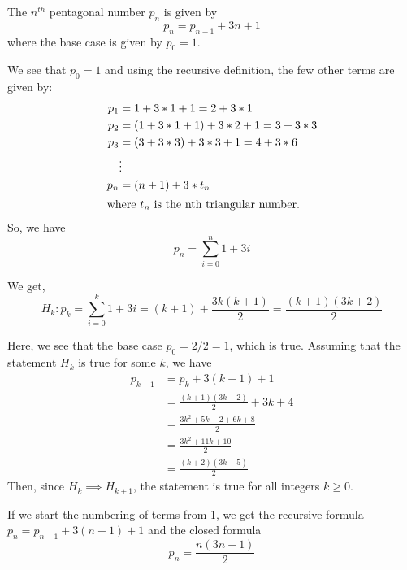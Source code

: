 \begin{questions}
    \begin{solution}
        The $n^{th}$ pentagonal number $p_n$ is given by $$p_{n}
        =p_{n-1} + 3n +1$$
        where the base case is given by $p_0=1$.
    \end{solution}

    \begin{solution}
        We see that $p_0 = 1$ and using the recursive definition, 
        the few other terms are given by:
        \begin{align*}
            p_1 &= 1 +3*1+1=2+3*1\\
            p_2 &= \left(1+3*1+1\right) +3*2+1
            =3+3*3\\
            p_3 &= \left(3+3*3\right)+3*3+1
            =4+3*6\\
            &\vdots\\
            p_n &= (n+1)+3*t_n\\
            \shortintertext{where $t_n$ is the nth triangular number.}
        \end{align*}
        So, we have
        $$p_n = \sum_{i=0}^n{1+3i}$$
    \end{solution}

    \begin{solution}
        We get, 
        \begin{equation}
            H_k: p_k = \sum_{i=0}^k{1+3i} = (k+1)+\frac{3k(k+1)}{2}
        =\frac{(k+1)(3k+2)}{2}
        \end{equation}

        Here, we see that the base case $p_0=2/2=1$, which is true. 
        Assuming that the statement $H_k$ is true for some $k$, we 
        have
        \begin{align*}
            p_{k+1} &= p_k+3(k+1)+1\\
            &=\frac{(k+1)(3k+2)}{2} +3k+4\\
            &=\frac{3k^2+5k+2+6k+8}{2}\\
            &=\frac{3k^2+11k+10}{2}\\
            &=\frac{(k+2)(3k+5)}{2}
        \end{align*}
        Then, since $H_k\implies H_{k+1}$, the statement is true for
        all integers $k\ge 0$.
        \begin{note}
            If we start the numbering of terms from 1, 
            we get the recursive formula $p_n=p_{n-1}+3(n-1)+1$ 
            and the closed formula 
            $$p_n=\frac{n(3n-1)}{2}$$
        \end{note}
    \end{solution}
\end{questions}